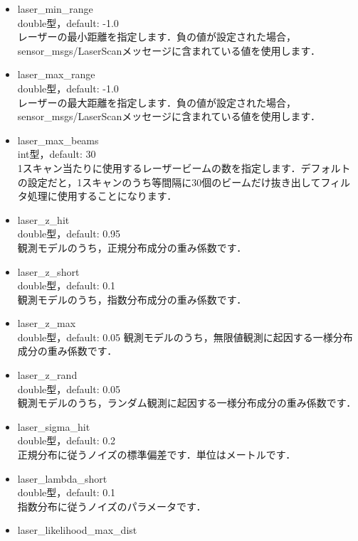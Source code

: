 \documentclass[{../../master}]{subfiles}
\begin{document}
\begin{itemize}
  \item \textsf{laser\_min\_range} \\
    double型，default: -1.0 \\
    レーザーの最小距離を指定します．負の値が設定された場合，\textsf{sensor\_msgs/LaserScan}メッセージに含まれている値を使用します．
  \item \textsf{laser\_max\_range} \\
    double型，default: -1.0 \\
    レーザーの最大距離を指定します．負の値が設定された場合，\textsf{sensor\_msgs/LaserScan}メッセージに含まれている値を使用します．
  \item \textsf{laser\_max\_beams} \\
    int型，default: 30 \\
    1スキャン当たりに使用するレーザービームの数を指定します．デフォルトの設定だと，1スキャンのうち等間隔に30個のビームだけ抜き出してフィルタ処理に使用することになります．
  \item \textsf{laser\_z\_hit} \\
    double型，default: 0.95 \\
    観測モデルのうち，正規分布成分の重み係数です．
  \item \textsf{laser\_z\_short} \\
    double型，default: 0.1 \\
    観測モデルのうち，指数分布成分の重み係数です．
  \item \textsf{laser\_z\_max} \\
    double型，default: 0.05
    観測モデルのうち，無限値観測に起因する一様分布成分の重み係数です．
  \item \textsf{laser\_z\_rand} \\
    double型，default: 0.05 \\
    観測モデルのうち，ランダム観測に起因する一様分布成分の重み係数です．
  \item \textsf{laser\_sigma\_hit} \\
    double型，default: 0.2 \\
    正規分布に従うノイズの標準偏差です．単位はメートルです．
  \item \textsf{laser\_lambda\_short} \\
    double型，default: 0.1 \\
    指数分布に従うノイズのパラメータです．
  \item \textsf{laser\_likelihood\_max\_dist} \\

\end{itemize}
\end{document}
